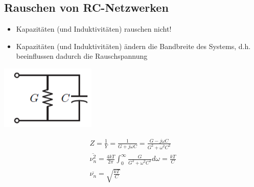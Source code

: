 \subsection{Rauschen von RC-Netzwerken}
\begin{itemize}
  \item Kapazitäten (und Induktivitäten) rauschen nicht!
  \item Kapazitäten (und Induktivitäten) ändern die Bandbreite des Systems, d.h.
  beeinflussen dadurch die Rauschspannung
\end{itemize}
\begin{minipage}{9cm}
\includegraphics[scale=0.4]{pictures/rcnetzwerk}
\end{minipage}
\begin{minipage}{9cm}
\begin{gather*}
Z=\frac{1}{Y}=\frac{1}{G+j\omega C}=\frac{G-j\omega C}{G^2+\omega^2C^2}\\
\overline{\nu^2_{n}}=\frac{4kT}{2\pi}\int^{\infty}_{0}\frac{G}{G^2+\omega^2C^2}d\omega=\frac{kT}{C}\\
\overline{\nu_{n}}=\sqrt{\frac{kT}{C}}
\end{gather*}
\end{minipage}

